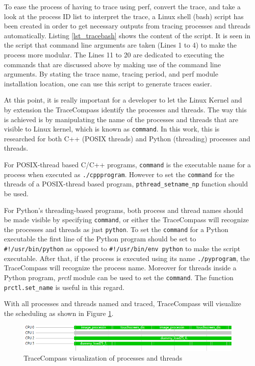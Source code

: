 \begin{itemize}
	To ease the process of having to trace using perf, convert the trace, and take a look at the process ID list to interpret the trace, a Linux shell (bash) script has been created in order to get necessary outputs from tracing processes and threads automatically. Listing \ref{lst_tracebash} shows the content of the script. It is seen in the script that command line arguments are taken (Lines 1 to 4) to make the process more modular. The Lines 11 to 20 are dedicated to executing the commands that are discussed above by making use of the command line arguments. By stating the trace name, tracing period, and perf module installation location, one can use this script to generate traces easier. %
	
	
	At this point, it is really important for a developer to let the Linux Kernel and by extension the TraceCompass identify the processes and threads. The way this is achieved is by manipulating the name of the processes and threads that are visible to Linux kernel, which is known as \texttt{command}. In this work, this is researched for both C++ (POSIX threads) and Python (threading) processes and threads.
	
	For POSIX-thread based C/C++ programs, \texttt{command} is the executable name for a process when executed as \texttt{./cppprogram}. However to set the \texttt{command} for the threads of a POSIX-thread based program, \texttt{pthread{\_}setname{\_}np} function should be used.
	
	For Python's threading-based programs, both process and thread names should be made visible by specifying \texttt{command}, or either the TraceCompass will recognize the processes and threads as just \texttt{python}. To set the \texttt{command} for a Python executable the first line of the Python program should be set to \texttt{\#!/usr/bin/python} as opposed to \texttt{\#!/usr/bin/env python} to make the script executable. After that, if the process is executed using its name \texttt{./pyprogram}, the TraceCompass will recognize the process name. Moreover for threads inside a Python program, \textit{prctl} module can be used to set the \texttt{command}. The function \texttt{prctl.set{\_}name} is useful in this regard.
	
	With all processes and threads named and traced, TraceCompass will visualize the scheduling as shown in Figure \ref{fig:tracecompasscommands}.
	
	\begin{figure}[!ht]
		\centering
		\captionsetup{justification=centering}
		\includegraphics[width=\textwidth]{content/images/tracecompasscommands.png}
		\caption{TraceCompass visualization of processes and threads}
		\label{fig:tracecompasscommands}
	\end{figure}

\end{itemize}

